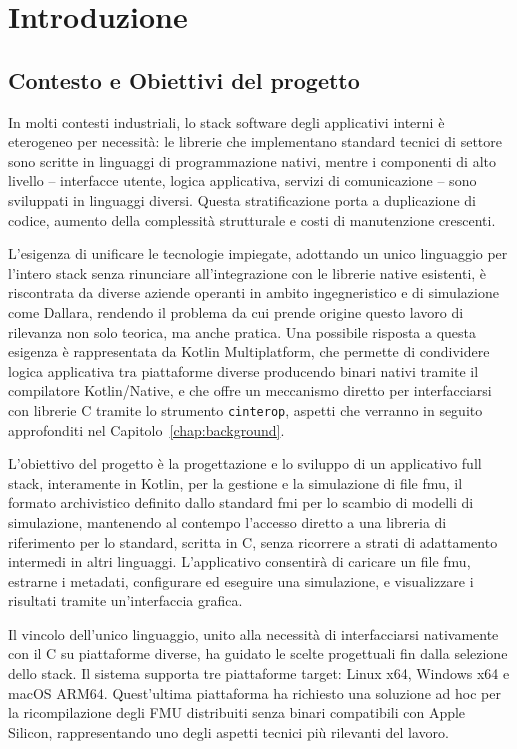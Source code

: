 \chapter{Introduzione}
\label{chap:introduction}

\section{Contesto e Obiettivi del progetto}
\label{sec:intro-contesto}

In molti contesti industriali, lo stack software degli applicativi interni è eterogeneo per necessità: le librerie che implementano standard tecnici di settore sono scritte in linguaggi di programmazione nativi, mentre i componenti di alto livello -- interfacce utente, logica applicativa, servizi di comunicazione -- sono sviluppati in linguaggi diversi. Questa stratificazione porta a duplicazione di codice, aumento della complessità strutturale e costi di manutenzione crescenti.

L'esigenza di unificare le tecnologie impiegate, adottando un unico linguaggio per l'intero stack senza rinunciare all'integrazione con le librerie native esistenti, è riscontrata da diverse aziende operanti in ambito ingegneristico e di simulazione come Dallara, rendendo il problema da cui prende origine questo lavoro di rilevanza non solo teorica, ma anche pratica. Una possibile risposta a questa esigenza è rappresentata da Kotlin Multiplatform, che permette di condividere logica applicativa tra piattaforme diverse producendo binari nativi tramite il compilatore Kotlin/Native, e che offre un meccanismo diretto per interfacciarsi con librerie C tramite lo strumento \texttt{cinterop}, aspetti che verranno in seguito approfonditi nel Capitolo~\ref{chap:background}.

L'obiettivo del progetto è la progettazione e lo sviluppo di un applicativo full stack, interamente in Kotlin, per la gestione e la simulazione di file \ac{fmu}, il formato archivistico definito dallo standard \ac{fmi} per lo scambio di modelli di simulazione, mantenendo al contempo l'accesso diretto a una libreria di riferimento per lo standard, scritta in C, senza ricorrere a strati di adattamento intermedi in altri linguaggi. L'applicativo consentirà di caricare un file \ac{fmu}, estrarne i metadati, configurare ed eseguire una simulazione, e visualizzare i risultati tramite un'interfaccia grafica.

Il vincolo dell'unico linguaggio, unito alla necessità di interfacciarsi nativamente con il C su piattaforme diverse, ha guidato le scelte progettuali fin dalla selezione dello stack. Il sistema supporta tre piattaforme target: Linux x64, Windows x64 e macOS ARM64. Quest'ultima piattaforma ha richiesto una soluzione ad hoc per la ricompilazione degli FMU distribuiti senza binari compatibili con Apple Silicon, rappresentando uno degli aspetti tecnici più rilevanti del lavoro.

